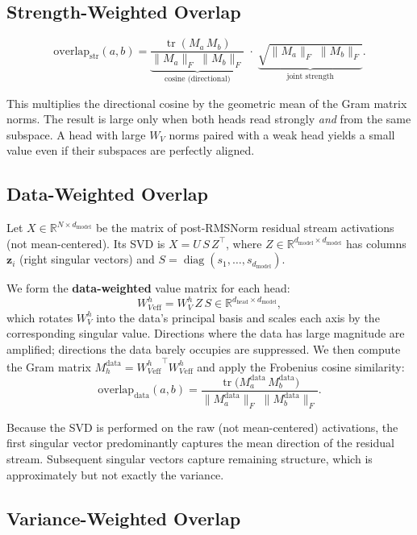 \documentclass[11pt]{article}
\newcommand{\WV}{W_V}
\newcommand{\frob}[1]{\lVert #1 \rVert_F}
\newcommand{\tr}{\operatorname{tr}}
\begin{document}
\subsection{Strength-Weighted Overlap}

\[
    \text{overlap}_{\text{str}}(a,b) = \underbrace{\frac{\tr(M_a\, M_b)}{\frob{M_a}\;\frob{M_b}}}_{\text{cosine (directional)}} \;\cdot\; \underbrace{\sqrt{\frob{M_a}\;\frob{M_b}}}_{\text{joint strength}}.
\]

This multiplies the directional cosine by the geometric mean of the Gram matrix norms. The result is large only when both heads read strongly \emph{and} from the same subspace. A head with large $\WV$ norms paired with a weak head yields a small value even if their subspaces are perfectly aligned.

\subsection{Data-Weighted Overlap}

Let $X \in \mathbb{R}^{N \times d_{\text{model}}}$ be the matrix of post-RMSNorm residual stream activations (not mean-centered). Its SVD is $X = U\, S\, Z^\top$, where $Z \in \mathbb{R}^{d_{\text{model}} \times d_{\text{model}}}$ has columns $\bm{z}_i$ (right singular vectors) and $S = \operatorname{diag}(s_1, \dots, s_{d_{\text{model}}})$.

We form the \textbf{data-weighted} value matrix for each head:
\[
    \WV^h_{\text{eff}} = \WV^h\, Z\, S \in \mathbb{R}^{d_{\text{head}} \times d_{\text{model}}},
\]
which rotates $\WV^h$ into the data's principal basis and scales each axis by the corresponding singular value. Directions where the data has large magnitude are amplified; directions the data barely occupies are suppressed. We then compute the Gram matrix $M_h^{\text{data}} = {\WV^h_{\text{eff}}}^\top \WV^h_{\text{eff}}$ and apply the Frobenius cosine similarity:
\[
    \text{overlap}_{\text{data}}(a,b) = \frac{\tr\!\bigl(M_a^{\text{data}}\, M_b^{\text{data}}\bigr)}{\frob{M_a^{\text{data}}}\;\frob{M_b^{\text{data}}}}.
\]

Because the SVD is performed on the raw (not mean-centered) activations, the first singular vector predominantly captures the mean direction of the residual stream. Subsequent singular vectors capture remaining structure, which is approximately but not exactly the variance.

\subsection{Variance-Weighted Overlap}
\end{document}

